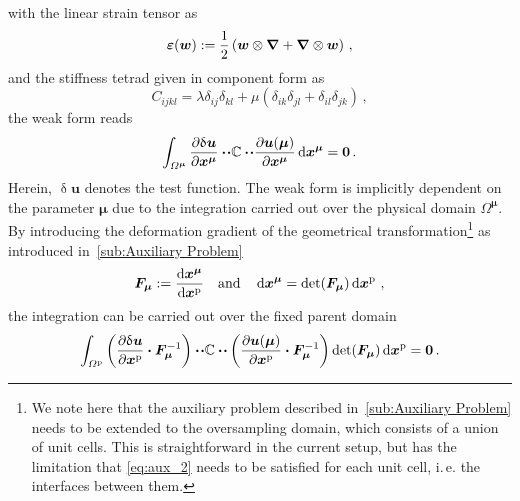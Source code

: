 \documentclass[a4paper]{eccomas_paper-2024}
\makeatletter
\newcommand{\ie}{i.\,e.\@\xspace}
\newcommand{\m}{\bm\mu}
\newcommand{\p}{\mathrm{p}}
\makeatother
\begin{document}
with the linear strain tensor as
\begin{equation}
    \label{eq:eps}
    \bm\varepsilon(\bm{w}):= \frac{1}{2}\left(\bm{w}\otimes\grad + \grad\otimes\bm{w}\right)\,,
\end{equation}
and the stiffness tetrad given in component form as
\begin{equation}
    C_{ijkl} = \lambda \delta_{ij}\delta_{kl} + \mu \left(\delta_{ik}\delta_{jl}+\delta_{il}\delta_{jk}\right)\,,
    \label{eq:stiffness_tetrad}
\end{equation}
the weak form reads
\begin{equation}
    \int_{\varOmega^{\m}} \pdv{\updelta\bm{u}}{\bm{x}^{\m}} \vdot\!\vdot \mathbb{C} \vdot\!\vdot
    \pdv{\bm{u}(\m)}{\bm{x}^{\m}} \dd{\bm{x}^{\m}} = \bm{0}\,.
    \label{eq:weak_osp}
\end{equation}
Herein, $\updelta\bm{u}$ denotes the test function.
The weak form is implicitly dependent on the parameter $\m$ due to the integration carried out over the physical domain $\varOmega^{\m}$.
By introducing the deformation gradient of the geometrical transformation\footnote{We note here that the auxiliary problem described in~\cref{sub:Auxiliary Problem} needs to be extended to the oversampling domain, which consists of a union of unit cells. This is straightforward in the current setup, but has the limitation that \cref{eq:aux_2} needs to be satisfied for each unit cell, \ie{} the interfaces between them.} as introduced in~\cref{sub:Auxiliary Problem}
\begin{equation}
    \bm{F}_{\m}:= \dv{\bm{x}^{\m}}{\bm{x}^{\p}}\quad\mathrm{and}\quad
    \dd{\bm{x}^{\m}}=\det(\bm{F}_{\m})\dd{\bm{x}^{\p}}\,,
    \label{eq:F_mu}
\end{equation}
the integration can be carried out over the fixed parent domain
\begin{equation}
    \int_{\varOmega^{\p}} \left(\pdv{\updelta\bm{u}}{\bm{x}^{\p}}\vdot\bm{F}^{-1}_{\m}\right)\vdot\!\vdot \mathbb{C} \vdot\!\vdot
    \left(\pdv{\bm{u}(\m)}{\bm{x}^{\p}}\vdot\bm{F}^{-1}_{\m}\right)\det(\bm{F}_{\m})\dd{\bm{x}^{\p}} = \bm{0}\,.
    \label{eq:weak_osp_parent}
\end{equation}
\end{document}
